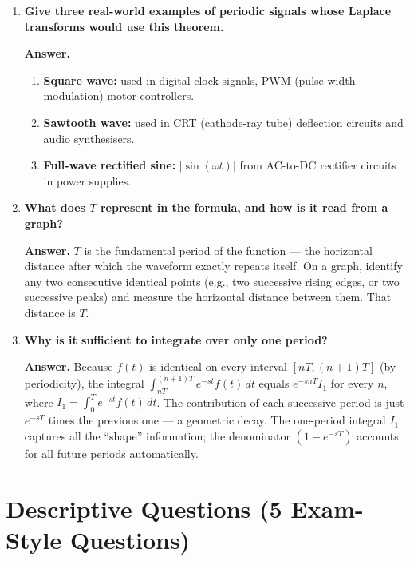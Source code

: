 \documentclass[12pt,a4paper]{article}
\begin{document}
\begin{enumerate}[label=\textbf{Q\arabic*.}, leftmargin=*, wide]
\item \textbf{Give three real-world examples of periodic signals whose Laplace
transforms would use this theorem.}

\textbf{Answer.}
\begin{enumerate}[label=(\roman*)]
  \item \textbf{Square wave:} used in digital clock signals, PWM (pulse-width
        modulation) motor controllers.
  \item \textbf{Sawtooth wave:} used in CRT (cathode-ray tube) deflection
        circuits and audio synthesisers.
  \item \textbf{Full-wave rectified sine:} $|\sin(\omega t)|$ from AC-to-DC
        rectifier circuits in power supplies.
\end{enumerate}

\item \textbf{What does $T$ represent in the formula, and how is it read from
a graph?}

\textbf{Answer.} $T$ is the fundamental period of the function --- the
horizontal distance after which the waveform exactly repeats itself. On a
graph, identify any two consecutive identical points (e.g., two successive
rising edges, or two successive peaks) and measure the horizontal distance
between them. That distance is $T$.

\item \textbf{Why is it sufficient to integrate over only one period?}

\textbf{Answer.} Because $f(t)$ is identical on every interval $[nT,(n+1)T]$
(by periodicity), the integral $\int_{nT}^{(n+1)T} e^{-st} f(t)\,dt$ equals
$e^{-snT} I_1$ for every $n$, where $I_1 = \int_0^T e^{-st} f(t)\,dt$.
The contribution of each successive period is just $e^{-sT}$ times the
previous one --- a geometric decay. The one-period integral $I_1$ captures
all the ``shape'' information; the denominator $(1-e^{-sT})$ accounts for
all future periods automatically.

\end{enumerate}

\section{Descriptive Questions (5 Exam-Style Questions)}
\end{document}
